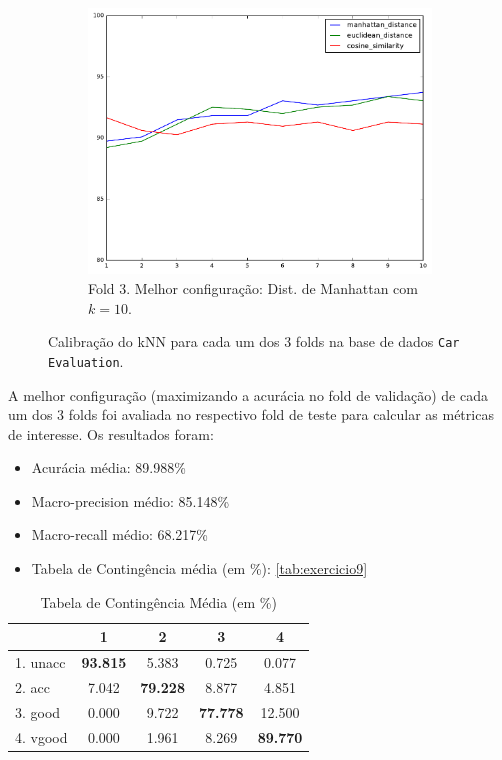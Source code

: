 \documentclass{article}
\begin{document}
\begin{figure}[t!]
\begin{subfigure}[t]{0.32\textwidth}
		\centering
		\includegraphics[width=\linewidth]{exercicio9-fold-3.pdf}
		\caption{Fold 3. Melhor configuração: Dist. de Manhattan com $k=10$.}
	\end{subfigure}
	\caption{Calibração do kNN para cada um dos 3 folds na base de dados \texttt{Car Evaluation}.}
	\label{fig:exercicio9}
\end{figure}

A melhor configuração (maximizando a acurácia no fold de validação) de cada um dos 3 folds foi avaliada no respectivo fold de teste para calcular as métricas de interesse. Os resultados foram:

\begin{itemize}
	\item Acurácia média: 89.988\%
	\item Macro-precision médio: 85.148\%
	\item Macro-recall médio: 68.217\%
	\item Tabela de Contingência média (em \%): \autoref{tab:exercicio9}
\end{itemize}

\begin{table}[]
	\centering
	\caption{Tabela de Contingência Média (em \%)}
	\label{tab:exercicio9}
	\begin{tabular}{@{}l|cccc@{}}
		& 1      & 2      & 3      & 4      \\ \midrule
		1. unacc & \textbf{93.815} & 5.383  & 0.725  & 0.077  \\
		2. acc   & 7.042  & \textbf{79.228} & 8.877  & 4.851  \\
		3. good  & 0.000  & 9.722  & \textbf{77.778} & 12.500 \\
		4. vgood & 0.000  & 1.961  & 8.269  & \textbf{89.770}
	\end{tabular}
\end{table}
\end{document}
